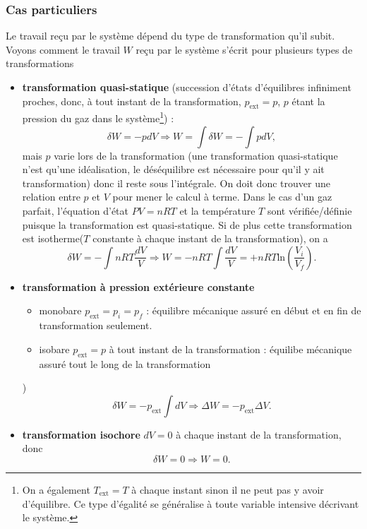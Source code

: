 \documentclass[11pt,a4paper]{report}
\begin{document}
\subsubsection{Cas particuliers}
Le travail reçu par le système dépend du type de transformation qu'il subit. Voyons comment le travail $W$ reçu par le système s'écrit pour plusieurs types de transformations
\begin{itemize}
	\item \textbf{transformation quasi-statique} (succession d'états d'équilibres infiniment proches, donc, à tout instant de la transformation, 
	$p_\text{ext} = p$, $p$ étant la pression du gaz dans le système\footnote{On a également $T_\text{ext} = T$ à chaque instant sinon il ne peut pas y avoir d'équilibre. 
	Ce type d'égalité se généralise à toute variable intensive décrivant le système.}) :
		\begin{equation}
			\delta W = -p dV \Rightarrow W = \int\delta W = -\int p dV,
		\end{equation}
		mais $p$ varie lors de la transformation (une transformation quasi-statique n'est qu'une idéalisation, 
		le déséquilibre est nécessaire pour qu'il y ait transformation) donc il reste sous l'intégrale. On doit donc trouver une relation entre $p$ et $V$ pour mener le 				calcul à terme. Dans le cas d'un gaz parfait, l'équation d'état $PV = nRT$ et la température $T$ sont vérifiée/définie puisque la transformation est quasi-statique. 
		Si de plus cette transformation est isotherme($T$ constante à chaque instant de la transformation), on a
		\begin{equation}
			\delta W = -\int nRT\frac{dV}{V} \Rightarrow W = - nRT\int \frac{dV}{V} = + nRT \text{ln}\left(\frac{V_i}{V_f}\right).
		\end{equation}
	\item \textbf{transformation à pression extérieure constante} 
		\begin{itemize}
			\item monobare $p_\text{ext} = p_{i} = p_f$ : équilibre mécanique assuré en début et en fin de transformation seulement.
			\item isobare $p_\text{ext} = p$ à tout instant de la transformation : équilibe mécanique assuré tout le long de la transformation
		\end{itemize} )
		\begin{equation}
			\delta W = -p_\text{ext}\int dV \Rightarrow \Delta W = -p_\text{ext}\Delta V.
		\end{equation}
	\item \textbf{transformation isochore} $dV = 0$ à chaque instant de la transformation, donc
		\begin{equation}
			\delta W = 0 \Rightarrow W = 0.
		\end{equation}
\end{itemize}
\end{document}
